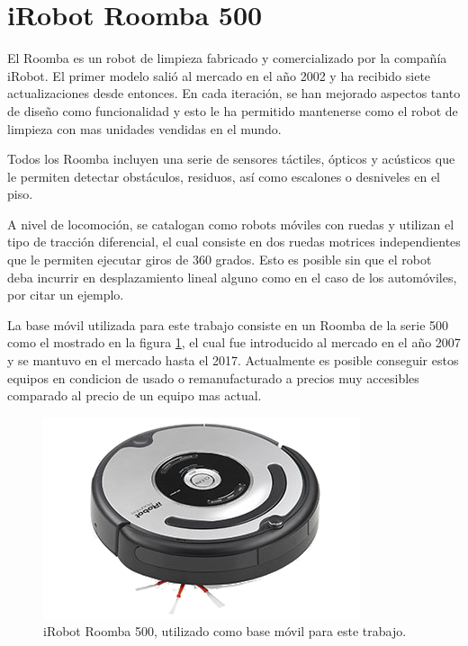 \section{iRobot Roomba 500}

El Roomba es un robot de limpieza fabricado y comercializado por la compañía iRobot. El primer modelo salió al mercado en el año 2002 y ha recibido siete actualizaciones desde entonces. En cada iteración, se han mejorado aspectos tanto de diseño como funcionalidad y esto le ha permitido mantenerse como el robot de limpieza con mas unidades vendidas en el mundo.

Todos los Roomba incluyen una serie de sensores táctiles, ópticos y acústicos que le permiten detectar obstáculos, residuos, así como escalones o desniveles en el piso.

A nivel de locomoción, se catalogan como robots móviles con ruedas y utilizan el tipo de tracción diferencial, el cual consiste en dos ruedas motrices independientes que le permiten ejecutar giros de 360 grados. Esto es posible sin que el robot deba incurrir en desplazamiento lineal alguno como en el caso de los automóviles, por citar un ejemplo.

La base móvil utilizada para este trabajo consiste en un Roomba de la serie 500 como el mostrado en la figura \ref{fig:roomba}, el cual fue introducido al mercado en el año 2007 y se mantuvo en el mercado hasta el 2017. Actualmente es posible conseguir estos equipos en condicion de usado o remanufacturado a precios muy accesibles comparado al precio de un equipo mas actual.

\begin{figure}[ht]
    \centering
    \includegraphics[scale=2.5]{./Figures/roomba.png}
    \caption{iRobot Roomba 500, utilizado como base móvil para este trabajo.\protect\footnotemark}
    \label{fig:roomba}
\end{figure}


